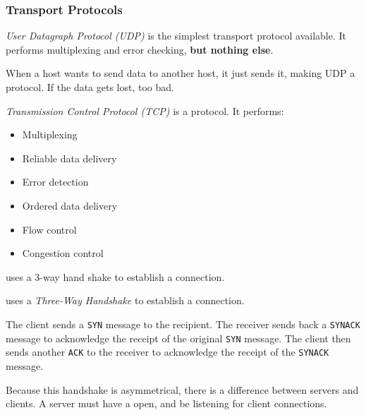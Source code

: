 \subsubsection{Transport Protocols}\label{subsubsec:Transport_Protocols}
\begin{definition}\label{def:User_Datagram_Protocol}
  \emph{User Datagraph Protocol (UDP)} is the simplest transport protocol available.
  It performs multiplexing and error checking, \textbf{but nothing else}.

  When a host wants to send data to another host, it just sends it, making UDP a  protocol.
  If the data gets lost, too bad.
\end{definition}

\begin{definition}\label{def:Transmission_Control_Protocol}
  \emph{Transmission Control Protocol (TCP)} is a  protocol.
  It performs:
  \begin{itemize}[noitemsep]
  \item Multiplexing
  \item Reliable data delivery
  \item Error detection
  \item Ordered data delivery
  \item Flow control
  \item Congestion control
  \end{itemize}
\end{definition}

 uses a 3-way hand shake to establish a connection.
\begin{definition}\label{def:TCP_3_Way_Handshake}
   uses a \emph{Three-Way Handshake} to establish a connection.
  
  The client sends a \texttt{SYN} message to the recipient.
  The receiver sends back a \texttt{SYN\textunderscore{}ACK} message to acknowledge the receipt of the original \texttt{SYN} message.
  The client then sends another \texttt{ACK} to the receiver to acknowledge the receipt of the \texttt{SYN\textunderscore{}ACK} message.

  Because this handshake is asymmetrical, there is a difference between servers and clients.
  A server must have a  open, and be listening for client connections.
\end{definition}

